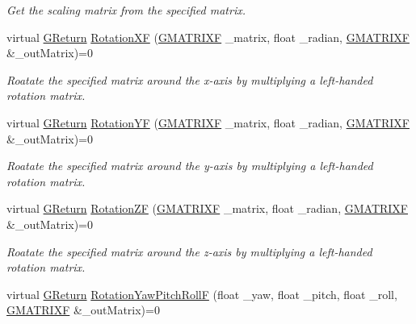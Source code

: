 \begin{DoxyCompactItemize}
\begin{DoxyCompactList}\small\item\em Get the scaling matrix from the specified matrix. \end{DoxyCompactList}\item 
virtual \mbox{\hyperlink{namespaceGW_a67a839e3df7ea8a5c5686613a7a3de21}{G\+Return}} \mbox{\hyperlink{classGW_1_1MATH_1_1GMatrix_acd8ef29804a2d807876b2f0a22a1f9b4}{Rotation\+XF}} (\mbox{\hyperlink{structGW_1_1MATH_1_1GMATRIXF}{G\+M\+A\+T\+R\+I\+XF}} \+\_\+matrix, float \+\_\+radian, \mbox{\hyperlink{structGW_1_1MATH_1_1GMATRIXF}{G\+M\+A\+T\+R\+I\+XF}} \&\+\_\+out\+Matrix)=0
\begin{DoxyCompactList}\small\item\em Roatate the specified matrix around the x-\/axis by multiplying a left-\/handed rotation matrix. \end{DoxyCompactList}\item 
virtual \mbox{\hyperlink{namespaceGW_a67a839e3df7ea8a5c5686613a7a3de21}{G\+Return}} \mbox{\hyperlink{classGW_1_1MATH_1_1GMatrix_afe5fa5399691dc690272dad5d3697ff9}{Rotation\+YF}} (\mbox{\hyperlink{structGW_1_1MATH_1_1GMATRIXF}{G\+M\+A\+T\+R\+I\+XF}} \+\_\+matrix, float \+\_\+radian, \mbox{\hyperlink{structGW_1_1MATH_1_1GMATRIXF}{G\+M\+A\+T\+R\+I\+XF}} \&\+\_\+out\+Matrix)=0
\begin{DoxyCompactList}\small\item\em Roatate the specified matrix around the y-\/axis by multiplying a left-\/handed rotation matrix. \end{DoxyCompactList}\item 
virtual \mbox{\hyperlink{namespaceGW_a67a839e3df7ea8a5c5686613a7a3de21}{G\+Return}} \mbox{\hyperlink{classGW_1_1MATH_1_1GMatrix_abce415225da8aa2592e1ef495fd9996b}{Rotation\+ZF}} (\mbox{\hyperlink{structGW_1_1MATH_1_1GMATRIXF}{G\+M\+A\+T\+R\+I\+XF}} \+\_\+matrix, float \+\_\+radian, \mbox{\hyperlink{structGW_1_1MATH_1_1GMATRIXF}{G\+M\+A\+T\+R\+I\+XF}} \&\+\_\+out\+Matrix)=0
\begin{DoxyCompactList}\small\item\em Roatate the specified matrix around the z-\/axis by multiplying a left-\/handed rotation matrix. \end{DoxyCompactList}\item 
virtual \mbox{\hyperlink{namespaceGW_a67a839e3df7ea8a5c5686613a7a3de21}{G\+Return}} \mbox{\hyperlink{classGW_1_1MATH_1_1GMatrix_a821ff1b8cda633278f4d0088d2063d4d}{Rotation\+Yaw\+Pitch\+RollF}} (float \+\_\+yaw, float \+\_\+pitch, float \+\_\+roll, \mbox{\hyperlink{structGW_1_1MATH_1_1GMATRIXF}{G\+M\+A\+T\+R\+I\+XF}} \&\+\_\+out\+Matrix)=0

\end{DoxyCompactItemize}
